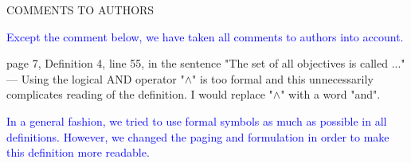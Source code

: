 \documentclass[11pt]{article}
\newcommand{\ilanswer}[1]{\textcolor{blue}{#1}}
\newcommand{\answer}[1]{\ilanswer{#1}\vspace*{1em}}
\begin{document}
COMMENTS TO AUTHORS

\answer{Except the comment below, we have taken all comments to authors into account.}

page 7, Definition 4, line 55, in the sentence "The set of all objectives is called ..." ---
Using the logical AND operator "$\land$" is too formal and this unnecessarily complicates reading of the definition.
I would replace "$\land$" with a word "and".

\answer{In a general fashion, we tried to use formal symbols as much as possible in all definitions.
However, we changed the paging and formulation in order to make this definition more readable.}

%
\end{document}
